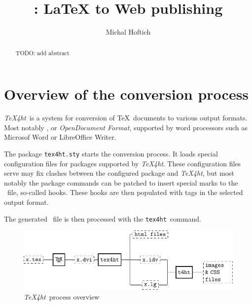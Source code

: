 \documentclass{ltugproc}
\author{Michal Hoftich}
\title{\texfourht: LaTeX to Web publishing}
\newcommand\term[1]{\textit{#1}}
\newcommand\command[1]{\texttt{#1}}
\newcommand\packagename[1]{\texttt{#1.sty}}
\newcommand\texfourht{\term{\TeX4ht}}
\newcommand\texfourhtcmd{\command{tex4ht}}
\begin{document}
\begin{abstract}
  TODO: add abstract
\end{abstract}
\maketitle

\section{Overview of the conversion process}
\texfourht\ is a system for conversion of \TeX\ documents to various output
formats. Most notably \HTML, or \term{OpenDocument Format}, supported by word processors such as Microsof Word or LibreOffice
Writer. 



The package \packagename{tex4ht} starts the conversion process. It loads special 
configuration files for packages supported by \texfourht. These configuration
files serve may fix clashes between the configured package and \texfourht, but most
notably the package commands can be patched to insert special marks to the \DVI\ file, so-called
hooks. These hooks are then populated with tags in the selected output format. 

The generated \DVI\ file is then processed with the \texfourhtcmd\ command.



\begin{figure}[hbt!]
  \includegraphics[width=\textwidth]{img/tex4ht_process.pdf}
\caption{\texfourht\ process overview}
\label{fig:overview}
\end{figure}
\end{document}
